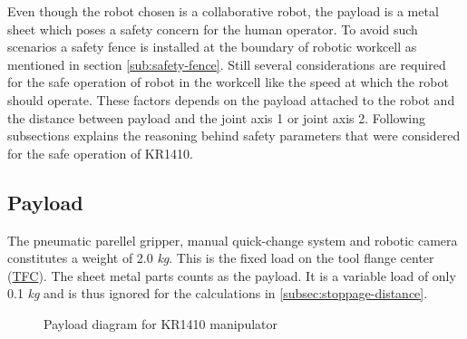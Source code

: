 Even though the robot chosen is a collaborative robot, the payload is a metal sheet which poses a safety concern for the human operator.
To avoid such scenarios a safety fence is installed at the boundary of robotic workcell as mentioned in section \ref{sub:safety-fence}.
Still several considerations are required for the safe operation of robot in the workcell like the speed at which the robot should operate. These factors depends on the payload attached to the robot and the distance between payload and the joint axis 1 or joint axis 2.
Following subsections explains the reasoning behind safety parameters that were considered for the safe operation of KR1410.

\subsection{Payload}
\label{subsec:payload}
The pneumatic parellel gripper, manual quick-change system and robotic camera constitutes a weight of 2.0 \textit{kg}.
This is the fixed load on the tool flange center (\hyperref[acro:TFC]{TFC}). The sheet metal parts counts as the payload.
It is a variable load of only 0.1 \textit{kg} and is thus ignored for the calculations in \ref{subsec:stoppage-distance}.


\begin{figure}[h]
    \centering
    
    \caption{Payload diagram for KR1410 manipulator}
    \label{fig:kr1410-payload-diagram}
\end{figure}


